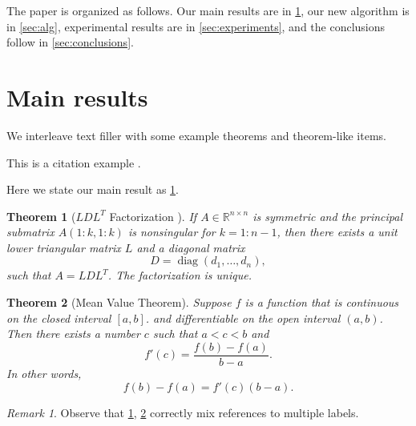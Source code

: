 \documentclass[10pt,reqno,final]{amsart}
\numberwithin{equation}{section}
\numberwithin{figure}{section}
\numberwithin{table}{section}
\theoremstyle{plain}
\newtheorem{theorem}{Theorem}[section]
\theoremstyle{definition}
\theoremstyle{remark}
\newtheorem{remark}{Remark}[section]
\begin{document}
The paper is organized as follows. Our main results are in
\ref{sec:main}, our new algorithm is in \ref{sec:alg}, experimental
results are in \ref{sec:experiments}, and the conclusions follow in
\ref{sec:conclusions}.

\section{Main results}
\label{sec:main}


We interleave text filler with some example theorems and theorem-like
items.

\lipsum[5]

This is a citation example \cite{WoZhMeSh05}.

Here we state our main result as \ref{thm:bigthm}.

\begin{theorem}[$LDL^T$ Factorization \cite{GoVa13}]\label{thm:bigthm}
  If $A \in \mathbb{R}^{n \times n}$ is symmetric and the principal
  submatrix $A(1:k,1:k)$ is nonsingular for $k=1:n-1$, then there
  exists a unit lower triangular matrix $L$ and a diagonal matrix
  \begin{equation*}
    D = \operatorname{diag}(d_1,\dots,d_n),  %
  \end{equation*}
  such that $A=LDL^T$. The factorization is unique.
\end{theorem}

\lipsum[7]

\begin{theorem}[Mean Value Theorem]\label{thm:mvt}
  Suppose $f$ is a function that is continuous on the closed interval
  $[a,b]$.  and differentiable on the open interval $(a,b)$.
  Then there exists a number $c$ such that $a < c < b$ and
  \begin{equation*}
    f'(c) = \frac{f(b)-f(a)}{b-a}.
  \end{equation*}
  In other words,
  \begin{equation*}
    f(b)-f(a) = f'(c)(b-a).
  \end{equation*}
\end{theorem}

\begin{remark}
Observe that \ref{thm:bigthm}, \ref{thm:mvt} correctly mix references
to multiple labels.
\end{remark}
\end{document}
